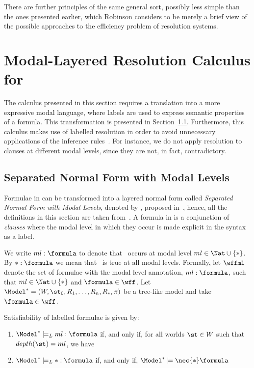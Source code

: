 There are further principles of the same general sort, possibly less simple than
the ones presented earlier, which Robinson considers to be merely a brief view
of the possible approaches to the efficiency problem of resolution systems. 

\section{Modal-Layered Resolution Calculus for }%
\label{sec:calculus}

The calculus presented in this section requires a translation into a more
expressive modal language, where labels are used to express semantic properties
of a formula. This transformation is presented in Section~\ref{sec:snf}.
Furthermore, this calculus makes use of labelled resolution in order to avoid
unnecessary applications of the inference rules~\cite{nalon2015modal}. For
instance, we do not apply resolution to clauses at different modal levels, since
they are not, in fact, contradictory.

\subsection{Separated Normal Form with Modal Levels}%
\label{sec:snf}

Formulae in  can be transformed into a layered normal form called
\emph{Separated Normal Form with Modal Levels}, denoted by , proposed
in~\cite{journals/jal/NalonD07}, hence, all the definitions in this section are
taken from~\cite{journals/jal/NalonD07}. A formula in  is a
conjunction of \emph{clauses} where the modal level in which they occur is made
explicit in the syntax as a label.

We write $ml: \formula$ to denote that \formula~occurs at modal level $ml\in
\Nat \cup \{*\}$. By $*: \formula$ we mean that \formula~is true at
all modal levels. Formally, let $\wffml$ denote the set of formulae with
the modal level annotation, $ml : \formula$, such that $ml \in \Nat \cup \{*\}$
and $\formula \in \wff$. Let $\Model^* = (W, \st_0, R_1, \ldots, R_n, R_*, \pi)$
be a tree-like model and take $\formula \in \wff$. 

\begin{definition}
Satisfiability of labelled formulae is given by:

\begin{enumerate}
    \item $\Model^* \models_L ml : \formula$ if, and only if, for all worlds
        $\st \in W$ such that $depth(\st) = ml$, we have
        \sat{\Model^*}{\st}{\formula} 
    \item $\Model^* \models_L * : \formula$ if, and only if, $\Model^* \models
        \nec{*} \formula$
\end{enumerate}
    
\end{definition}

